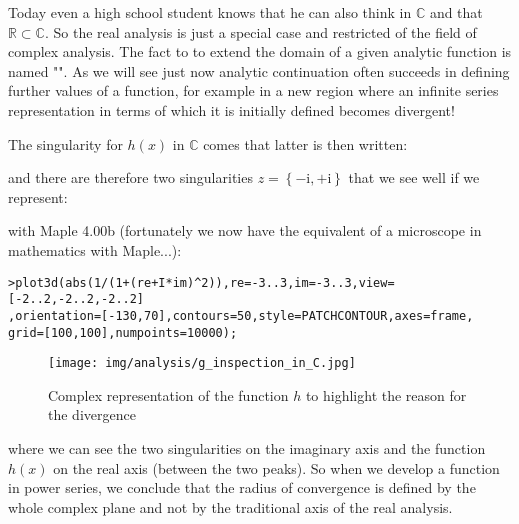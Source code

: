 	Today even a high school student knows that he can also think in $\mathbb{C}$ and that $\mathbb{R} \subset \mathbb{C}$. So the real analysis is just a special case and restricted of the field of complex analysis. The fact to to extend the domain of a given analytic function is named "". As we will see just now analytic continuation often succeeds in defining further values of a function, for example in a new region where an infinite series representation in terms of which it is initially defined becomes divergent!
	
	The singularity for $h (x)$ in $\mathbb{C}$ comes that latter is then  written:
	
	and there are therefore two singularities $z=\left\lbrace{-\mathrm{i},+\mathrm{i} }\right\rbrace$ that we see well if we represent:
	
	with Maple 4.00b (fortunately we now have the equivalent of a microscope in mathematics with Maple...):
	
	\texttt{>plot3d(abs(1/(1+(re+I*im)\string^2)),re=-3..3,im=-3..3,view=[-2..2,-2..2,-2..2]\\
	,orientation=[-130,70],contours=50,style=PATCHCONTOUR,axes=frame,\\
	grid=[100,100],numpoints=10000);}
	
	\begin{figure}[H]
		\begin{center}
			\texttt{[image: img/analysis/g\_inspection\_in\_C.jpg]}
		\end{center}	
		\caption{Complex representation of the function $h$ to highlight the reason for the divergence}
	\end{figure}
	where we can see the two singularities on the imaginary axis and the function $h (x)$ on the real axis (between the two peaks). So when we develop a function in power series, we conclude that the radius of convergence is defined by the whole complex plane and not by the traditional axis of the real analysis.
	
